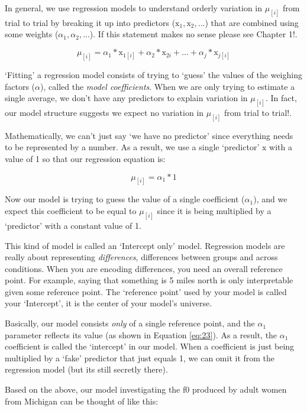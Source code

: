 \documentclass[
]{book}
\begin{document}
In general, we use regression models to understand orderly variation in \(\mu_{[i]}\) from trial to trial by breaking it up into predictors (\(\mathrm{x}_{1}, \mathrm{x}_{2},...\)) that are combined using some weights (\(\alpha_1, \alpha_2,...\)). If this statement makes no sense please see Chapter 1!.

\[
\mu_{[i]} = \alpha_1*\mathrm{x}_{1{[i]}} + \alpha_2*\mathrm{x}_{2i}+...+\alpha_j*\mathrm{x}_{j{[i]}}
\label{eq:22}
\]

`Fitting' a regression model consists of trying to `guess' the values of the weighing factors (\(\alpha\)), called the \emph{model coefficients}. When we are only trying to estimate a single average, we don't have any predictors to explain variation in \(\mu_{[i]}\). In fact, our model structure suggests we expect no variation in \(\mu_{[i]}\) from trial to trial!.

Mathematically, we can't just say `we have no predictor' since everything needs to be represented by a number. As a result, we use a single `predictor' \(\mathrm{x}\) with a value of 1 so that our regression equation is:

\[
\mu_{[i]} = \alpha_1*1
\label{eq:23}
\]

Now our model is trying to guess the value of a single coefficient (\(\alpha_1\)), and we expect this coefficient to be equal to \(\mu_{[i]}\) since it is being multiplied by a `predictor' with a constant value of 1.

This kind of model is called an `Intercept only' model. Regression models are really about representing \emph{differences}, differences between groups and across conditions. When you are encoding differences, you need an overall reference point. For example, saying that something is 5 miles north is only interpretable given some reference point. The `reference point' used by your model is called your `Intercept', it is the center of your model's universe.

Basically, our model consists \emph{only} of a single reference point, and the \(\alpha_1\) parameter reflects its value (as shown in Equation \eqref{eq:23}). As a result, the \(\alpha_1\) coefficient is called the `intercept' in our model. When a coefficient is just being multiplied by a `fake' predictor that just equals 1, we can omit it from the regression model (but its still secretly there).

Based on the above, our model investigating the f0 produced by adult women from Michigan can be thought of like this:
\end{document}
